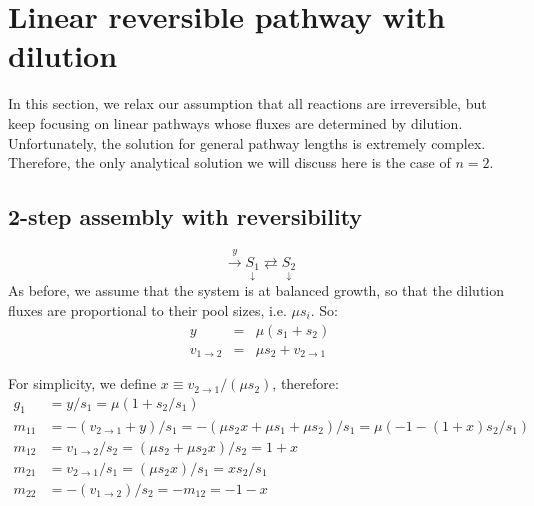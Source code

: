 \documentclass{article}
\newcommand{\fin}{\ensuremath{\langle f \rangle}}
\newcommand{\flux}[2]{\ensuremath{v_{{#1} \rightarrow {#2}}}}
\begin{document}
\begin{center}
\end{center}

\section{Linear reversible pathway with dilution}
In this section, we relax our assumption that all reactions are irreversible, but keep focusing on linear pathways whose fluxes are determined by dilution. Unfortunately, the solution for general pathway lengths is extremely complex. Therefore, the only analytical solution we will discuss here is the case of $n = 2$.

\subsection{2-step assembly with reversibility}

\begin{equation}
    \overset{y}{\rightarrow} \underset{\downarrow}{S_1}
    \rightleftarrows \underset{\downarrow}{S_2}
\end{equation}
As before, we assume that the system is at balanced growth, so that the dilution fluxes are proportional to their pool sizes, i.e. $\mu s_i$. So:
\begin{eqnarray}
    y &=& \mu (s_1 + s_2)\\
    \flux{1}{2} &=& \mu s_2 + \flux{2}{1}
\end{eqnarray}

For simplicity, we define $x \equiv \flux{2}{1} / (\mu s_2)$, therefore:
\begin{align*}
    g_1 &= y/s_1 = \mu(1 + s_2/s_1)\\
    m_{11} &= -(\flux{2}{1} + y)/s_1 = -(\mu s_2 x + \mu s_1 + \mu s_2)/s_1 = 
    \mu ( -1 - (1 + x) s_2/s_1)\\
    m_{12} &= \flux{1}{2} / s_2 = (\mu s_2 + \mu s_2 x) / s_2 = 1 + x\\
    m_{21} &= \flux{2}{1} / s_1 = (\mu s_2 x) / s_1 = x s_2 / s_1\\
    m_{22} &= -(\flux{1}{2})/s_2 = -m_{12} = -1-x
\end{align*}
\end{document}
